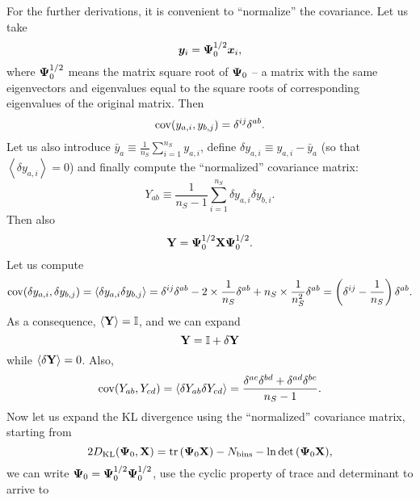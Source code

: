 For the further derivations, it is convenient to ``normalize'' the covariance. Let us take
\begin{equation} \label{eq:measurement-normalization}
\bm y_i = {\bf \Psi}_0^{1/2} \bm x_i,
\end{equation}
where ${\bf \Psi}_0^{1/2}$ means the matrix square root of ${\bf \Psi}_0$ -- a matrix with the same eigenvectors and eigenvalues equal to the square roots of corresponding eigenvalues of the original matrix.
Then
\begin{equation}
\operatorname{cov} (y_{a,i}, y_{b,j}) = \delta^{ij} \delta^{ab}.
\end{equation}
Let us also introduce $\bar y_a \equiv \frac1{n_S} \sum_{i=1}^{n_S} y_{a,i}$, define $\delta y_{a,i} \equiv y_{a,i} - \bar y_a$ (so that $\left\langle \delta y_{a,i} \right\rangle = 0$) and finally compute the ``normalized'' covariance matrix:
\begin{equation} \label{eq:Y-definition}
Y_{ab} \equiv \frac1{n_S-1} \sum_{i=1}^{n_S} \delta y_{a,i} \delta y_{b,i}.
\end{equation}
Then also
\begin{equation} \label{eq:Y-relation}
{\bf Y} = {\bf \Psi}_0^{1/2} {\bf X \Psi}_0^{1/2}.
\end{equation}
Let us compute
\begin{equation}
\operatorname{cov} (\delta y_{a,i}, \delta y_{b,j}) = \left\langle \delta y_{a,i} \delta y_{b,j} \right\rangle = \delta^{ij} \delta^{ab} - 2 \times \frac1{n_S} \delta^{ab} + n_S \times \frac1{n_S^2} \delta^{ab} = \left( \delta^{ij} - \frac1{n_S} \right) \delta^{ab}.
\end{equation}
As a consequence, ${\left\langle \bf Y \right\rangle} = \bf \mathbb I$, and we can expand
\begin{equation} \label{eq:delta-Y}
{\bf Y} = {\bf \mathbb I} + {\bf \delta Y}
\end{equation}
while ${\left\langle \bf \delta Y \right\rangle} = 0$. Also,
\begin{equation} \label{eq:Y-covariance}
\operatorname{cov} (Y_{ab}, Y_{cd}) = \left\langle \delta Y_{ab} \delta Y_{cd} \right\rangle = \frac{\delta^{ac} \delta^{bd} + \delta^{ad} \delta^{bc}}{n_S-1}.
\end{equation}
Now let us expand the KL divergence using the ``normalized'' covariance matrix, starting from
\begin{equation}
2 D_{\rm KL} \Arg{{\bf \Psi}_0, {\bf X}} = \tr \Arg{{\bf \Psi}_0 {\bf X}} - N_{\rm bins} - \ln \det \Arg{{\bf \Psi}_0 {\bf X}},
\end{equation}
we can write ${\bf \Psi}_0 = {\bf \Psi}_0^{1/2} {\bf \Psi}_0^{1/2}$, use the cyclic property of trace and determinant to arrive to
